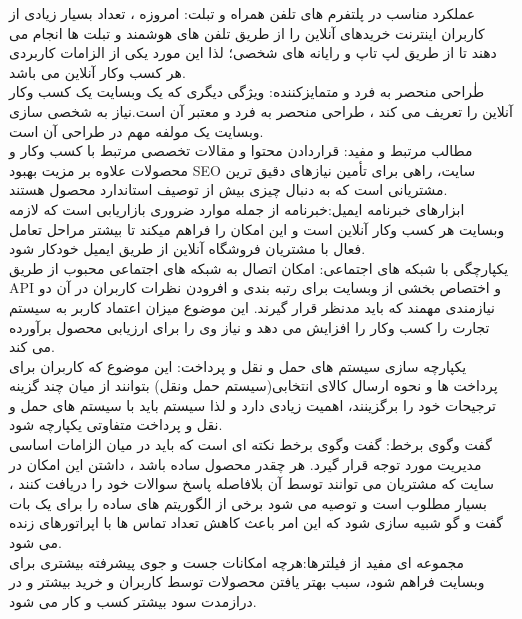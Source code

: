 \documentclass[14pt]{article}
\begin{document}
\begin{flushright}
\begin{itemize}
عملکرد مناسب در پلتفرم های تلفن همراه و تبلت: امروزه ، تعداد بسیار زیادی از کاربران اینترنت خریدهای آنلاین را از طریق تلفن های هوشمند و تبلت ها انجام می دهند تا از طریق لپ تاپ و رایانه های شخصی؛ لذا این مورد یکی از الزامات کاربردی هر کسب وکار آنلاین می باشد.\\
طٰراحی منحصر به فرد و متمایزکننده: ویژگی دیگری که یک وبسایت یک کسب وکار آنلاین را تعریف می کند ، طراحی منحصر به فرد و معتبر آن است.نیاز به شخصی سازی وبسایت یک مولفه مهم در طراحی آن است.\\
مطالب مرتبط و مفید: قراردادن محتوا و مقالات تخصصی مرتبط با کسب وکار و محصولات علاوه بر مزیت بهبود SEO سایت، راهی برای تأمین نیازهای دقیق ترین مشتریانی است که به دنبال چیزی بیش از توصیف استاندارد محصول هستند.\\
ابزارهای خبرنامه ایمیل:خبرنامه از جمله موارد ضروری بازاریابی است که لازمه وبسایت هر کسب وکار آنلاین است و  این امکان را فراهم میکند تا بیشتر مراحل تعامل فعال با مشتریان فروشگاه آنلاین از طریق ایمیل خودکار شود.\\ 
یکپارچگی با شبکه های اجتماعی: امکان اتصال به  شبکه های اجتماعی محبوب از طریق API و اختصاص بخشی از وبسایت برای رتبه بندی و افرودن نظرات کاربران در آن دو نیازمندی مهمند که باید مدنظر قرار گیرند. این  موضوع میزان اعتماد کاربر به سیستم تجارت را کسب وکار را افزایش می دهد و نیاز وی را برای ارزیابی محصول برآورده می کند.\\
یکپارچه سازی سیستم های حمل و نقل و پرداخت: این موضوع که کاربران برای پرداخت ها و نحوه ارسال کالای انتخابی(سیستم حمل ونقل) بتوانند از میان چند گزینه ترجیحات خود را برگزینند، اهمیت زیادی دارد و لذا سیستم باید با سیستم های حمل و نقل و پرداخت متفاوتی یکپارچه شود.\\
گفت وگوی برخط: گفت وگوی برخط نکته ای است که باید در میان الزامات اساسی مدیریت مورد توجه قرار گیرد. هر چقدر محصول ساده باشد ، داشتن این امکان در سایت که مشتریان می توانند توسط آن بلافاصله پاسخ سوالات خود را دریافت کنند ، بسیار مطلوب است و توصیه می شود برخی از الگوریتم های ساده را برای یک بات گفت و گو شبیه سازی شود که این امر باعث کاهش تعداد تماس ها با اپراتورهای زنده می شود.\\
مجموعه ای مفید از فیلترها:هرچه امکانات جست و جوی پیشرفته بیشتری برای وبسایت فراهم شود، سبب بهتر یافتن محصولات توسط کاربران و خرید بیشتر و در درازمدت سود بیشتر کسب و کار می شود.
\end{itemize}
\end{flushright}
\end{document}
